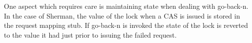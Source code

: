 One aspect which requires care is maintaining {\sword} state when dealing with
go-back-n. In the case of Sherman, the value of the lock when a CAS is issued is
stored in the request mapping stub. If go-back-n is invoked the state of the
lock is reverted to the value it had just prior to issuing the failed request.






